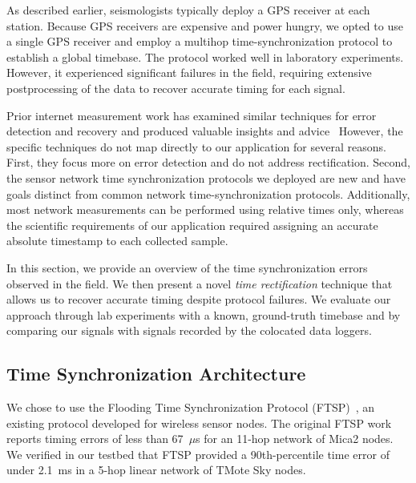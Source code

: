 As described earlier, seismologists typically deploy a GPS receiver at each
station. Because GPS receivers are expensive and power hungry, we opted to
use a single GPS receiver and employ a multihop time-synchronization protocol
to establish a global timebase. The protocol worked well in laboratory
experiments. However, it experienced significant failures in the field,
requiring extensive postprocessing of the data to recover accurate timing for
each signal.

Prior internet measurement work has examined similar techniques for error
detection and recovery and produced valuable insights and
advice~\cite{paxson98calibrating,1028824} However, the specific techniques do
not map directly to our application for several reasons. First, they focus
more on error detection and do not address rectification. Second, the sensor
network time synchronization protocols we deployed are new and have goals
distinct from common network time-synchronization protocols. Additionally,
most network measurements can be performed using relative times only, whereas
the scientific requirements of our application required assigning an accurate
absolute timestamp to each collected sample.

In this section, we provide an overview of the time synchronization errors
observed in the field. We then present a novel \textit{time rectification}
technique that allows us to recover accurate timing despite protocol
failures. We evaluate our approach through lab experiments with a known,
ground-truth timebase and by comparing our signals with signals recorded by
the colocated data loggers.

\subsection{Time Synchronization Architecture}

We chose to use the Flooding Time Synchronization Protocol
(FTSP)~\cite{ftsp}, an existing protocol developed for wireless sensor nodes.
The original FTSP work reports timing errors of less than 67~$\mu$s for an
11-hop network of Mica2 nodes. We verified in our testbed that FTSP provided
a 90th-percentile time error of under 2.1~ms in a 5-hop linear network of
TMote Sky nodes.

